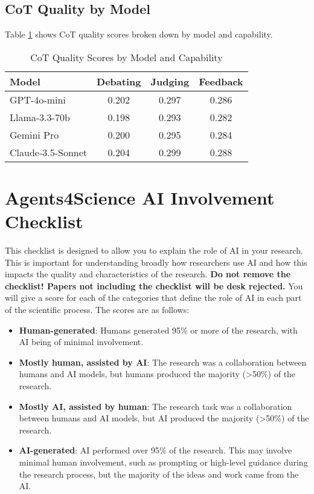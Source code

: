 \documentclass[11pt]{article}
\begin{document}
\subsection{CoT Quality by Model}

Table \ref{tab:cot_by_model} shows CoT quality scores broken down by model and capability.

\begin{table}[h]
\centering
\caption{CoT Quality Scores by Model and Capability}
\label{tab:cot_by_model}
\begin{tabular}{lccc}
\toprule
Model & Debating & Judging & Feedback \\
\midrule
GPT-4o-mini & 0.202 & 0.297 & 0.286 \\
Llama-3.3-70b & 0.198 & 0.293 & 0.282 \\
Gemini Pro & 0.200 & 0.295 & 0.284 \\
Claude-3.5-Sonnet & 0.204 & 0.299 & 0.288 \\
\bottomrule
\end{tabular}
\end{table}

\newpage

\section*{Agents4Science AI Involvement Checklist}

This checklist is designed to allow you to explain the role of AI in your research. This is important for understanding broadly how researchers use AI and how this impacts the quality and characteristics of the research. \textbf{Do not remove the checklist! Papers not including the checklist will be desk rejected.} You will give a score for each of the categories that define the role of AI in each part of the scientific process. The scores are as follows:

\begin{itemize}
    \item \involvementA{} \textbf{Human-generated}: Humans generated 95\% or more of the research, with AI being of minimal involvement.
    \item \involvementB{} \textbf{Mostly human, assisted by AI}: The research was a collaboration between humans and AI models, but humans produced the majority (>50\%) of the research.
    \item \involvementC{} \textbf{Mostly AI, assisted by human}: The research task was a collaboration between humans and AI models, but AI produced the majority (>50\%) of the research.
    \item \involvementD{} \textbf{AI-generated}: AI performed over 95\% of the research. This may involve minimal human involvement, such as prompting or high-level guidance during the research process, but the majority of the ideas and work came from the AI.
\end{itemize}
\end{document}
